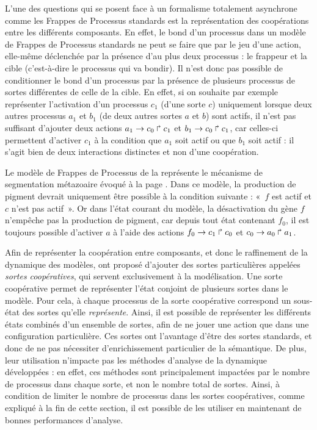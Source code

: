 L'une des questions qui se posent face à un formalisme totalement asynchrone comme
les Frappes de Processus standards est la représentation des coopérations entre les différents
composants.
En effet, le bond d'un processus dans un modèle de Frappes de Processus standards
ne peut se faire que par le jeu d'une action,
elle-même déclenchée par la présence d'au plus deux processus :
le frappeur et la cible (c'est-à-dire le processus qui va bondir).
Il n'est donc pas possible de conditionner le bond d'un processus par la présence
de plusieurs processus de sortes différentes de celle de la cible.
En effet,
si on souhaite par exemple représenter l'activation d'un processus $c_1$ (d'une sorte $c$)
uniquement lorsque deux autres processus $a_1$ et $b_1$ (de deux autres sortes $a$ et $b$)
sont actifs, il n'est pas suffisant d'ajouter deux actions
$a_1\rightarrow c_0\Rsh c_1$ et $b_1\rightarrow c_0\Rsh c_1$,
car celles-ci permettent d'activer $c_1$ à la condition que $a_1$ soit actif
ou que $b_1$ soit actif :
il s'agit bien de deux interactions distinctes et non d'une coopération.

\begin{example}
  Le modèle de Frappes de Processus de la 
  représente le mécanisme de segmentation métazoaire évoqué à la page
  .
  Dans ce modèle, la production de pigment devrait uniquement être possible
  à la condition suivante : «~$f$ est actif et $c$ n'est pas actif~».
  Or dans l'état courant du modèle,
  la désactivation du gène $f$ n'empêche pas la production de pigment,
  car depuis tout état contenant $f_0$, il est toujours possible d'activer $a$
  à l'aide des actions $f_0\rightarrow c_1\Rsh c_0$ et $c_0\rightarrow a_0\Rsh a_1$.
\end{example}

Afin de représenter la coopération entre composants,
et donc le raffinement de la dynamique des modèles,
 ont proposé d'ajouter des sortes particulières appelées
\emph{sortes coopératives}, qui servent exclusivement à la modélisation.
Une sorte coopérative permet de représenter l'état conjoint de plusieurs sortes dans le modèle.
Pour cela, à chaque processus de la sorte coopérative correspond un sous-état des sortes
qu'elle \emph{représente}.
Ainsi, il est possible de représenter les différents états combinés d'un ensemble de sortes,
afin de ne jouer une action que dans une configuration particulière.
Ces sortes ont l'avantage d'être des sortes standards,
et donc de ne pas nécessiter d'enrichissement particulier de la sémantique.
De plus, leur utilisation n'impacte pas les méthodes d'analyse de la dynamique développées :
en effet, ces méthodes sont principalement impactées par le nombre de processus dans chaque sorte,
et non le nombre total de sortes.
Ainsi, à condition de limiter le nombre de processus dans les sortes coopératives,
comme expliqué à la fin de cette section,
il est possible de les utiliser en maintenant de bonnes performances d'analyse.

